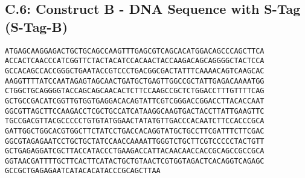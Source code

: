 \subsection*{C.6: Construct B - DNA Sequence with S-Tag (S-Tag-B)}
\begin{verbatim}
ATGAGCAAGGAGACTGCTGCAGCCAAGTTTGAGCGTCAGCACATGGACAGCCCAGCTTCA
ACCACTCAACCCATCGGTTCTACTACATCCACAACTACCAAGACAGCAGGGGCTACTCCA
GCCACAGCCACCGGGCTGAATACCGTCCCTGACGGCGACTATTTCAAAACAGTCAAGCAC
AAGGTTTTATCCAATAGAGTAGCAACTGATGCTGAGTTGGCCGCTATTGAGACAAAATGG
CTGGCTGCAGGGGTACCAGCAGCAACACTCTTCCAAGCCGCTCTGGACCTTTGTTTTCAG
GCTGCCGACATCGGTTGTGGTGAGGACACAGTATTCGTCGGGACCGGACCTTACACCAAT
GGCGTTAGCTTCCAAGACCTCGCTGCCATCATAAGGCAAGTGACTACCTTATTGAAGTTC
TGCCGACGTTACGCCCCCTGTGTATGGAACTATATGTTGACCCACAATCTTCCACCCGCA
GATTGGCTGGCACGTGGCTTCTATCCTGACCACAGGTATGCTGCCTTCGATTTCTTCGAC
GGCGTAGAGAATCCTGCTGCTATCCAACCAAAATTGGGTCTGCTTCGTCCCCCTACTGTT
GCTGAGAGGATCGCTTACCATACCCTGAAGACCATTACAACAACCACCGCAGCCGCCGCA
GGTAACGATTTTGCTTCACTTCATACTGCTGTAACTCGTGGTAGACTCACAGGTCAGAGC
GCCGCTGAGAGAATCATACACATACCCGCAGCTTAA
\end{verbatim}
